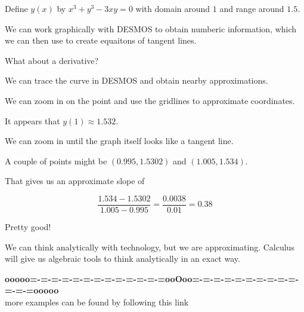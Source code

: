 \documentclass{ximera}
\begin{document}
\begin{example}

Define $y(x)$ by $x^3 + y^3 - 3 x y = 0$ with domain around $1$ and range around $1.5$.


We can work graphically with DESMOS to obtain numberic information, which we can then use to create equaitons of tangent lines.







\begin{center}
\end{center}



What about a derivative?

We can trace the curve in DESMOS and obtain nearby approximations.


We can zoom in on the point and use the gridlines to approximate coordinates.






\begin{center}
\end{center}

It appears that $y(1) \approx 1.532$.



We can zoom in until the graph itself looks like a tangent line.



\begin{center}
\end{center}

A couple of points might be $(0.995, 1.5302)$ and $(1.005, 1.534)$.

That gives us an approximate slope of 

\[
\frac{1.534 - 1.5302}{1.005 - 0.995} = \frac{0.0038}{0.01} = 0.38
\]


Pretty good!


\end{example}



We can think analytically with technology, but we are approximating.  Calculus will give us algebraic tools to think analytically in an exact way.






\begin{center}
\textbf{\textcolor{green!50!black}{ooooo=-=-=-=-=-=-=-=-=-=-=-=-=ooOoo=-=-=-=-=-=-=-=-=-=-=-=-=ooooo}} \\

more examples can be found by following this link\\ 

\end{center}
\end{document}

